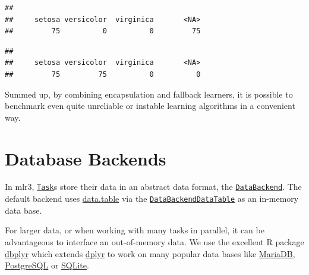 \documentclass[
]{scrbook}
\newenvironment{Shaded}{\begin{snugshade}}{\end{snugshade}}
\newcommand{\AttributeTok}[1]{\textcolor[rgb]{0.77,0.63,0.00}{#1}}
\newcommand{\CommentTok}[1]{\textcolor[rgb]{0.56,0.35,0.01}{\textit{#1}}}
\newcommand{\FunctionTok}[1]{\textcolor[rgb]{0.00,0.00,0.00}{#1}}
\newcommand{\NormalTok}[1]{#1}
\newcommand{\OtherTok}[1]{\textcolor[rgb]{0.56,0.35,0.01}{#1}}
\newcommand{\SpecialCharTok}[1]{\textcolor[rgb]{0.00,0.00,0.00}{#1}}
\newcommand{\StringTok}[1]{\textcolor[rgb]{0.31,0.60,0.02}{#1}}
\renewenvironment{Shaded} {\begin{snugshade}\small} {\end{snugshade}}
\begin{document}
\begin{verbatim}
## 
##     setosa versicolor  virginica       <NA> 
##         75          0          0         75
\end{verbatim}

\begin{Shaded}
\end{Shaded}

\begin{verbatim}
## 
##     setosa versicolor  virginica       <NA> 
##         75         75          0          0
\end{verbatim}

Summed up, by combining encapsulation and fallback learners, it is possible to benchmark even quite unreliable or instable learning algorithms in a convenient way.

\hypertarget{backends}{%
\section{Database Backends}\label{backends}}

In mlr3, \href{https://mlr3.mlr-org.com/reference/Task.html}{\texttt{Task}}s store their data in an abstract data format, the \href{https://mlr3.mlr-org.com/reference/DataBackend.html}{\texttt{DataBackend}}.
The default backend uses \href{https://cran.r-project.org/package=data.table}{data.table} via the \href{https://mlr3.mlr-org.com/reference/DataBackendDataTable.html}{\texttt{DataBackendDataTable}} as an in-memory data base.

For larger data, or when working with many tasks in parallel, it can be advantageous to interface an out-of-memory data.
We use the excellent R package \href{https://cran.r-project.org/package=dbplyr}{dbplyr} which extends \href{https://cran.r-project.org/package=dplyr}{dplyr} to work on many popular data bases like \href{https://mariadb.org/}{MariaDB}, \href{https://www.postgresql.org/}{PostgreSQL} or \href{https://www.sqlite.org}{SQLite}.
\end{document}
